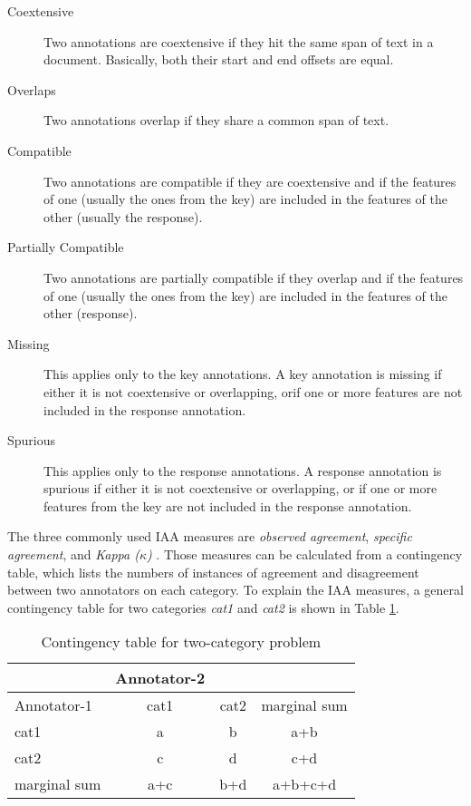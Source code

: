 \begin{description}

\item[Coextensive] Two annotations are coextensive if they hit the same span of
text in a document. Basically, both their start and end offsets are equal.

\item[Overlaps] Two annotations overlap if they share a common span of text.

\item[Compatible] Two annotations are compatible if they are coextensive and if
the features of one (usually the ones from the key) are included in
the features of the other (usually the response).

\item[Partially Compatible] Two annotations are partially compatible if they
overlap and if the features of one (usually the ones from the key) are included in
the features of the other (response).

\item[Missing] This applies only to the key annotations. A key annotation is
missing if either it is not coextensive or overlapping, orif one or more
features are not included in the response annotation.

\item[Spurious] This applies only to the response annotations. A response
annotation is spurious if either it is not coextensive or overlapping, or if one or
more features from the key are not included in the response
annotation.

\end{description}


The three commonly used IAA measures are {\em observed agreement}, {\em specific agreement}, 
and {\em Kappa ($\kappa$)} \cite{Hripcsak02}. Those measures can be 
calculated from a contingency table, which lists the numbers of instances of 
agreement and disagreement between two annotators on each category. To explain the 
IAA measures, a general contingency table for two categories {\em cat1} and {\em cat2}
 is shown in Table \ref{table:iaa-kappa:contingency}.

\begin{table}[hbt]
{\centering
\begin{tabular}{|l|cc|c|} 
\hline
   & Annotator-2 & & \\
\hline
Annotator-1  & cat1 & cat2 & marginal sum\\
\hline
 cat1& a & b & a+b\\ 
cat2 & c & d & c+d\\
\hline
marginal sum & a+c & b+d &a+b+c+d\\
 \hline
\end{tabular}\par}
\caption{Contingency table for two-category problem}
\label{table:iaa-kappa:contingency}
\end{table}


